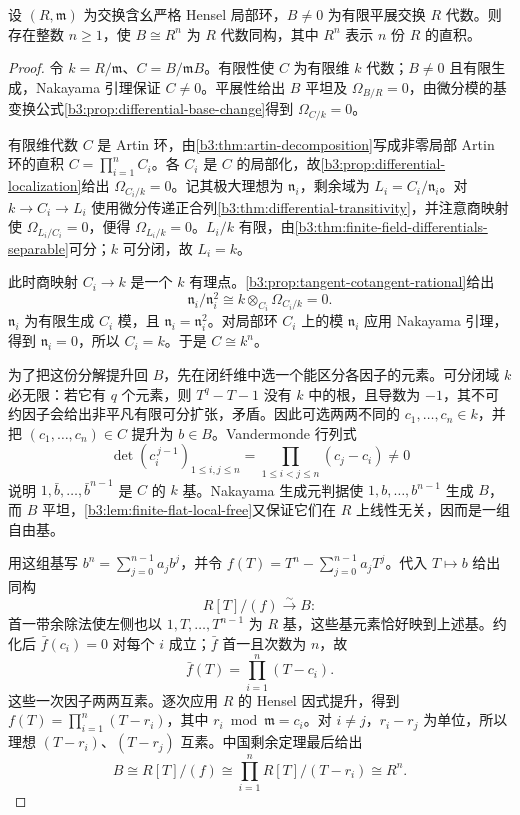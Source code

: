 \begin{proposition}\label{b3:prop:strict-henselian-finite-etale-split}
	设 \((R,\mathfrak m)\) 为交换含幺严格 Hensel 局部环，\(B\ne0\) 为有限平展交换 \(R\) 代数。则存在整数 \(n\ge1\)，使 \(B\cong R^n\) 为 \(R\) 代数同构，其中 \(R^n\) 表示 \(n\) 份 \(R\) 的直积。
\end{proposition}
\begin{proof}
	令 \(k=R/\mathfrak m\)、\(C=B/\mathfrak mB\)。有限性使 \(C\) 为有限维 \(k\) 代数；\(B\ne0\) 且有限生成，Nakayama 引理保证 \(C\ne0\)。平展性给出 \(B\) 平坦及 \(\Omega_{B/R}=0\)，由微分模的基变换公式\cref{b3:prop:differential-base-change}得到 \(\Omega_{C/k}=0\)。

	有限维代数 \(C\) 是 Artin 环，由\cref{b3:thm:artin-decomposition}写成非零局部 Artin 环的直积 \(C=\prod_{i=1}^n C_i\)。各 \(C_i\) 是 \(C\) 的局部化，故\cref{b3:prop:differential-localization}给出 \(\Omega_{C_i/k}=0\)。记其极大理想为 \(\mathfrak n_i\)，剩余域为 \(L_i=C_i/\mathfrak n_i\)。对 \(k\to C_i\to L_i\) 使用微分传递正合列\cref{b3:thm:differential-transitivity}，并注意商映射使 \(\Omega_{L_i/C_i}=0\)，便得 \(\Omega_{L_i/k}=0\)。\(L_i/k\) 有限，由\cref{b3:thm:finite-field-differentials-separable}可分；\(k\) 可分闭，故 \(L_i=k\)。

	此时商映射 \(C_i\to k\) 是一个 \(k\) 有理点。\cref{b3:prop:tangent-cotangent-rational}给出
	\[
		\mathfrak n_i/\mathfrak n_i^2 \cong k\otimes_{C_i}\Omega_{C_i/k}=0.
	\]
	\(\mathfrak n_i\) 为有限生成 \(C_i\) 模，且 \(\mathfrak n_i=\mathfrak n_i^2\)。对局部环 \(C_i\) 上的模 \(\mathfrak n_i\) 应用 Nakayama 引理，得到 \(\mathfrak n_i=0\)，所以 \(C_i=k\)。于是 \(C\cong k^n\)。

	为了把这份分解提升回 \(B\)，先在闭纤维中选一个能区分各因子的元素。可分闭域 \(k\) 必无限：若它有 \(q\) 个元素，则 \(T^q-T-1\) 没有 \(k\) 中的根，且导数为 \(-1\)，其不可约因子会给出非平凡有限可分扩张，矛盾。因此可选两两不同的 \(c_1,\ldots,c_n\in k\)，并把 \((c_1,\ldots,c_n)\in C\) 提升为 \(b\in B\)。Vandermonde 行列式
	\[
		\det(c_i^{\,j-1})_{1\le i,j\le n} =\prod_{1\le i<j\le n}(c_j-c_i)\ne0
	\]
	说明 \(1,\bar b,\ldots,\bar b^{n-1}\) 是 \(C\) 的 \(k\) 基。Nakayama 生成元判据使 \(1,b,\ldots,b^{n-1}\) 生成 \(B\)，而 \(B\) 平坦，\cref{b3:lem:finite-flat-local-free}又保证它们在 \(R\) 上线性无关，因而是一组自由基。

	用这组基写 \(b^n=\sum_{j=0}^{n-1}a_jb^j\)，并令 \(f(T)=T^n-\sum_{j=0}^{n-1}a_jT^j\)。代入 \(T\mapsto b\) 给出同构
	\[
		R[T]/(f)\xrightarrow{\sim}B:
	\]
	首一带余除法使左侧也以 \(1,T,\ldots,T^{n-1}\) 为 \(R\) 基，这些基元素恰好映到上述基。约化后 \(\bar f(c_i)=0\) 对每个 \(i\) 成立；\(\bar f\) 首一且次数为 \(n\)，故
	\[
		\bar f(T)=\prod_{i=1}^n(T-c_i).
	\]
	这些一次因子两两互素。逐次应用 \(R\) 的 Hensel 因式提升，得到 \(f(T)=\prod_{i=1}^n(T-r_i)\)，其中 \(r_i\bmod\mathfrak m=c_i\)。对 \(i\ne j\)，\(r_i-r_j\) 为单位，所以理想 \((T-r_i)\)、\((T-r_j)\) 互素。中国剩余定理最后给出
	\[
		B\cong R[T]/(f) \cong\prod_{i=1}^n R[T]/(T-r_i) \cong R^n.
	\]
\end{proof}

